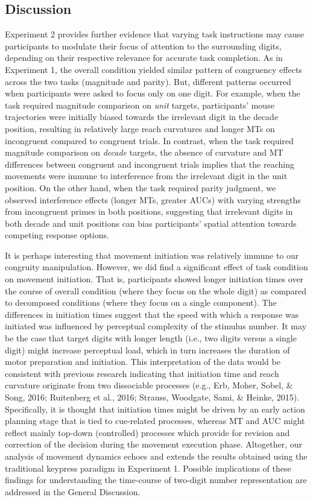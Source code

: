 \documentclass[english,man]{apa6}
\theoremstyle{definition}
\theoremstyle{definition}
\theoremstyle{definition}
\theoremstyle{remark}
\begin{document}
\subsection{Discussion}\label{discussion-1}

Experiment 2 provides further evidence that varying task instructions
may cause participants to modulate their focus of attention to the
surrounding digits, depending on their respective relevance for accurate
task completion. As in Experiment 1, the overall condition yielded
similar pattern of congruency effects across the two tasks (magnitude
and parity). But, different patterns occurred when participants were
asked to focus only on one digit. For example, when the task required
magnitude comparison on \emph{unit} targets, participants' mouse
trajectories were initially biased towards the irrelevant digit in the
decade position, resulting in relatively large reach curvatures and
longer MTs on incongruent compared to congruent trials. In contrast,
when the task required magnitude comparison on \emph{decade} targets,
the absence of curvature and MT differences between congruent and
incongruent trials implies that the reaching movements were immune to
interference from the irrelevant digit in the unit position. On the
other hand, when the task required parity judgment, we observed
interference effects (longer MTs, greater AUCs) with varying strengths
from incongruent primes in both positions, suggesting that irrelevant
digits in both decade and unit positions can bias participants' spatial
attention towards competing response options.

It is perhaps interesting that movement initiation was relatively immune
to our congruity manipulation. However, we did find a significant effect
of task condition on movement initiation. That is, participants showed
longer initiation times over the course of overall condition (where they
focus on the whole digit) as compared to decomposed conditions (where
they focus on a single component). The differences in initiation times
suggest that the speed with which a response was initiated was
influenced by perceptual complexity of the stimulus number. It may be
the case that target digits with longer length (i.e., two digits versus
a single digit) might increase perceptual load, which in turn increases
the duration of motor preparation and initiation. This interpretation of
the data would be consistent with previous research indicating that
initiation time and reach curvature originate from two dissociable
processes (e.g., Erb, Moher, Sobel, \& Song, 2016; Ruitenberg et al.,
2016; Strauss, Woodgate, Sami, \& Heinke, 2015). Specifically, it is
thought that initiation times might be driven by an early action
planning stage that is tied to cue-related processes, whereas MT and AUC
might reflect mainly top-down (controlled) processes which provide for
revision and correction of the decision during the movement execution
phase. Altogether, our analysis of movement dynamics echoes and extends
the results obtained using the traditional keypress paradigm in
Experiment 1. Possible implications of these findings for understanding
the time-course of two-digit number representation are addressed in the
General Discussion.
\end{document}
